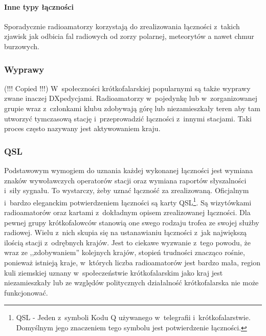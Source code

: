 \documentclass[]{mgr}
\begin{document}
                    \paragraph{Inne typy łączności}
                    Sporadycznie radioamatorzy korzystają do zrealizowania łączności z~takich zjawisk jak odbicia fal radiowych od zorzy polarnej, meteorytów a nawet chmur burzowych.

                \subsubsection{Wyprawy}
                (!!! Copied !!!) W~społeczności krótkofalarskiej popularnymi są także wyprawy zwane inaczej DXpedycjami. Radioamatorzy w~pojedynkę lub w~zorganizowanej grupie wraz z~członkami klubu zdobywają górę lub niezamieszkały teren aby tam utworzyć tymczasową stację i~przeprowadzić łączności z~innymi stacjami. Taki proces często nazywany jest aktywowaniem kraju.

                \subsubsection{QSL}
                Podstawowym wymogiem do uznania każdej wykonanej łączności jest wymiana znaków wywoławczych operatorów stacji oraz wymiana raportów słyszalności i~siły sygnału. To wystarczy, żeby uznać łączność za zrealizowaną. Oficjalnym i~bardzo eleganckim potwierdzeniem łączności są karty QSL\footnote{QSL - Jeden z~symboli Kodu Q używanego w~telegrafii i~krótkofalarstwie. Domyślnym jego znaczeniem tego symbolu jest potwierdzenie łączności.}. Są wizytówkami radioamatorów oraz kartami z~dokładnym opisem zrealizowanej łączności. Dla pewnej grupy krótkofalowców stanowią one swego rodzaju trofea ze swojej służby radiowej. Wielu z~nich skupia się na ustanawianiu łączności z~jak największą ilością stacji z~odrębnych krajów. Jest to ciekawe wyzwanie z~tego powodu, że wraz ze ,,zdobywaniem'' kolejnych krajów, stopień trudności znacząco rośnie, ponieważ istnieją kraje, w~których liczba radioamatorów jest bardzo mała, region kuli ziemskiej uznany w~społeczeństwie krótkofalarskim jako kraj jest niezamieszkały lub ze względów politycznych działalność krótkofalarska nie może funkcjonować.
\end{document}
